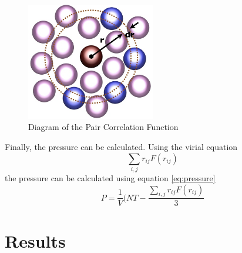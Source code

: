 \documentclass[letterpaper,12pt]{article}
\numberwithin{equation}{subsection}
\begin{document}
\begin{figure}[H]
        \centering
        \caption{Diagram of the Pair Correlation Function \label{fig:PCF}}
                \centering
                \includegraphics[width=0.50\textwidth]{pair_correl_example.png}
\end{figure}

\indent Finally, the pressure can be calculated. Using the virial equation
\begin{equation}
\sum_{i,j} r_{ij} F(r_{ij})
\end{equation}
the pressure can be calculated using equation \ref{eq:pressure}
\begin{equation}
\label{eq:pressure}
P = \frac{1}{V}(NT - \dfrac{\sum_{i,j} r_{ij} F(r_{ij})}{3}
\end{equation}

\newpage
\section{Results}
\end{document}
